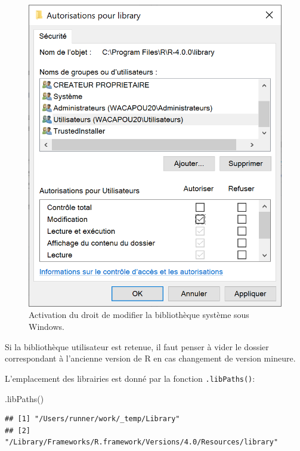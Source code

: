 \documentclass[
  11pt,
  french,
  a4paper,
  extrafontsizes,onecolumn,openright
  ]{memoir}
\newenvironment{Shaded}{\begin{snugshade}}{\end{snugshade}}
\newcommand{\FunctionTok}[1]{\textcolor[rgb]{0.00,0.00,0.00}{#1}}
\newcommand{\NormalTok}[1]{#1}
\begin{document}
\scriptsize

\begin{figure}

{\centering \includegraphics[width=0.8\linewidth]{images/R-library} 

}

\caption{Activation du droit de modifier la bibliothèque système sous Windows.}\label{fig:R-library}
\end{figure}

\normalsize

Si la bibliothèque utilisateur est retenue, il faut penser à vider le dossier correspondant à l'ancienne version de R en cas changement de version mineure.

L'emplacement des librairies est donné par la fonction \texttt{.libPaths()}:

\scriptsize

\begin{Shaded}
\begin{Highlighting}[]
\FunctionTok{.libPaths}\NormalTok{()}
\end{Highlighting}
\end{Shaded}

\begin{verbatim}
## [1] "/Users/runner/work/_temp/Library"                              
## [2] "/Library/Frameworks/R.framework/Versions/4.0/Resources/library"
\end{verbatim}
\end{document}
